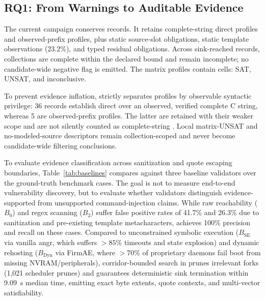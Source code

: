 \subsection{RQ1: From Warnings to Auditable Evidence}

The current campaign conserves \TSDSReviewCampaignRecords{} records. It retains
\TSDSReviewCampaignCompleteDirect{} complete-string direct profiles and
\TSDSReviewCampaignObservedPrefixDirect{} observed-prefix profiles, plus
\TSDSReviewCampaignStaticSource{} static source-slot obligations,
\TSDSReviewCampaignStaticReduction{} static template observations (23.2\%), and
\TSDSReviewCampaignResidual{} typed residual obligations. Across
\TSDSReviewCampaignSinkReached{} sink-reached records,
\TSDSReviewCampaignCompleteCollections{} collections are complete within the
declared bound and \TSDSReviewCampaignIncompleteCollections{} remain
incomplete; no candidate-wide negative flag is emitted. The
\TSDSReviewCampaignProfiles{} matrix profiles contain
\TSDSReviewCampaignCells{} cells: \TSDSReviewCampaignVectorSatCells{} SAT,
\TSDSReviewCampaignMatrixUnsatCells{} UNSAT, and
\TSDSReviewCampaignInconclusiveCells{} inconclusive.

To prevent evidence inflation, \tool strictly separates profiles by observable syntactic privilege: 36 records establish direct \svsat{} over an observed, verified complete C string, whereas 5 are observed-prefix \psat{} profiles. The latter are retained with their weaker scope and are not silently counted as complete-string \svsat. Local matrix-UNSAT and no-modeled-source descriptors remain collection-scoped and never become candidate-wide filtering conclusions.

To evaluate evidence classification across sanitization and quote escaping boundaries, Table~\ref{tab:baselines} compares \tool against three baseline validators over the \TSDSReviewControlledCases{} ground-truth benchmark cases. The goal is not to measure end-to-end vulnerability discovery, but to evaluate whether validators distinguish evidence-supported from unsupported command-injection claims. While raw reachability ($B_0$) and regex scanning ($B_2$) suffer false positive rates of 41.7\% and 26.3\% due to sanitization and pre-existing template metacharacters, \tool achieves 100\% precision and recall on these cases. Compared to unconstrained symbolic execution ($B_{\text{SE}}$ via vanilla angr, which suffers $>85\%$ timeouts and state explosion) and dynamic rehosting ($B_{\text{Dyn}}$ via FirmAE, where $>70\%$ of proprietary daemons fail boot from missing NVRAM/peripherals), corridor-bounded search in \tool prunes irrelevant forks (1,021 scheduler prunes) and guarantees deterministic sink termination within 9.09~s median time, emitting exact byte extents, quote contexts, and multi-vector satisfiability.

